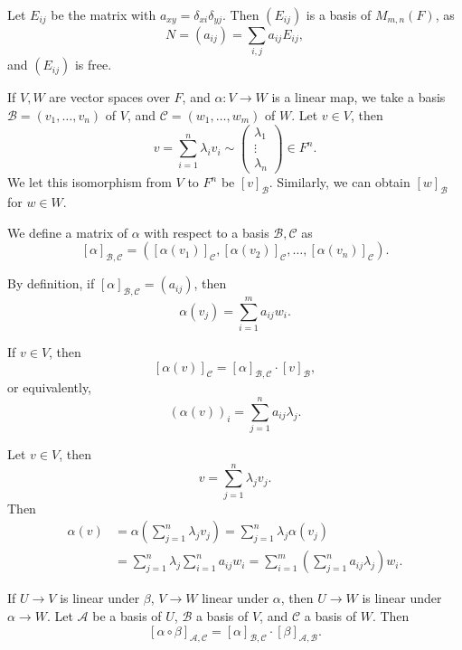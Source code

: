 \documentclass[12pt]{article}
\begin{document}
\begin{proofbox}
	Let $E_{ij}$ be the matrix with $a_{xy} = \delta_{xi}\delta_{yj}$. Then $(E_{ij})$ is a basis of $M_{m, n}(F)$, as
	\[
		N = (a_{ij}) = \sum_{i, j}a_{ij} E_{ij}
	,\]
	and $(E_{ij})$ is free.
\end{proofbox}

If $V, W$ are vector spaces over $F$, and $\alpha : V \to W$ is a linear map, we take a basis $\mathcal{B} = (v_1, \ldots, v_n)$ of $V$, and $\mathcal{C} = (w_1, \ldots, w_m)$ of $W$. Let $v \in V$, then
\[
v = \sum_{i = 1}^{n} \lambda_i v_i \sim
\begin{pmatrix}
	\lambda_1 \\
	\vdots \\
	\lambda_n
\end{pmatrix}
 \in F^{n}
.\]
We let this isomorphism from $V$ to $F^{n}$ be $[v]_{\mathcal{B}}$. Similarly, we can obtain $[w]_{\mathcal{B}}$ for $w \in W$.

\begin{definition}
	We define a matrix of $\alpha$ with respect to a basis $\mathcal{B}, \mathcal{C}$ as
	\[
		[\alpha]_{\mathcal{B}, \mathcal{C}} = ([\alpha(v_1)]_{\mathcal{C}}, [\alpha(v_2)]_{\mathcal{C}}, \ldots, [\alpha(v_n)]_{\mathcal{C}})
	.\]
\end{definition}

By definition, if $[\alpha]_{\mathcal{B}, \mathcal{C}} = (a_{ij})$, then
\[
	\alpha(v_j) = \sum_{i = 1}^{m} a_{ij} w_i
.\]

\begin{lemma}
	If $v \in V$, then
	\[
		[\alpha(v)]_{\mathcal{C}} = [\alpha]_{\mathcal{B}, \mathcal{C}} \cdot [v]_{\mathcal{B}}
	,\]
	or equivalently,
	\[
		(\alpha (v))_{i} = \sum_{j = 1}^{n} a_{ij} \lambda_j
	.\] 
\end{lemma}

\begin{proofbox}
	Let $v \in V$, then
\[
v = \sum_{j = 1}^{n} \lambda_j v_j
.\]
Then
 \begin{align*}
	 \alpha(v) &= \alpha \left( \sum_{j = 1}^{n} \lambda_j v_j \right) = \sum_{j = 1}^{n} \lambda_j \alpha(v_j) \\
		   &= \sum_{j = 1}^{n} \lambda_j \sum_{i = 1}^{n} a_{ij} w_i = \sum_{i = 1}^{m} \left( \sum_{j = 1}^{n} a_{ij} \lambda_j \right) w_i.
\end{align*}
\end{proofbox}

\begin{lemma}
	If $U \to V$ is linear under $\beta$, $V \to W$ linear under $\alpha$, then $U \to W$ is linear under $\alpha \to W$. Let $\mathcal{A}$ be a basis of $U$, $\mathcal{B}$ a basis of $V$, and $\mathcal{C}$ a basis of $W$. Then
	\[
		[\alpha \circ \beta]_{\mathcal{A}, \mathcal{C}} = [\alpha]_{\mathcal{B}, \mathcal{C}} \cdot [\beta]_{\mathcal{A}, \mathcal{B}}
	.\] 
\end{lemma}
\end{document}

